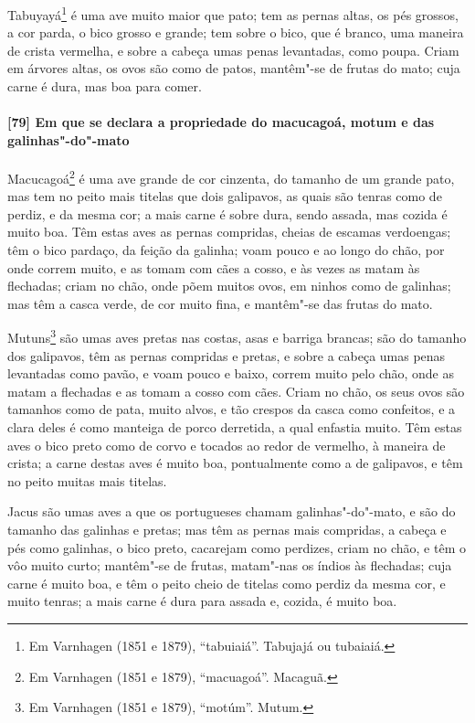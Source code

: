 Tabuyayá\footnote{ Em Varnhagen (1851 e 1879), ``tabuiaiá''. Tabujajá ou tubaiaiá.} é uma
ave muito maior que pato; tem as pernas altas, os pés grossos, a cor parda, o bico grosso
e grande; tem sobre o bico, que é branco, uma maneira de crista vermelha, e sobre a cabeça
umas penas levantadas, como poupa. Criam em árvores altas, os ovos são como de patos,
mantêm"-se de frutas do mato; cuja carne é dura, mas boa para comer.

\paragraph{[79] Em que se declara a propriedade do macucagoá, motum e das galinhas"-do"-mato}\quad
Macucagoá\footnote{ Em Varnhagen (1851 e 1879), ``macuagoá''. Macaguã.} é uma ave grande
de cor cinzenta, do tamanho de um grande pato, mas tem no peito mais titelas que dois
galipavos, as quais são tenras como de perdiz, e da mesma cor; a mais carne é sobre dura,
sendo assada, mas cozida é muito boa. Têm estas aves as
pernas compridas, cheias de escamas verdoengas; têm o bico pardaço, da feição da galinha;
voam pouco e ao longo do chão, por onde correm muito, e as tomam com cães a cosso, e às
vezes as matam às flechadas; criam no chão, onde põem muitos ovos, em ninhos como de
galinhas; mas têm a casca verde, de cor muito fina, e mantêm"-se das frutas do mato.

Mutuns\footnote{ Em Varnhagen (1851 e 1879), ``motúm''. Mutum.} são umas aves pretas nas
costas, asas e barriga brancas; são do tamanho dos galipavos, têm as pernas compridas e
pretas, e sobre a cabeça umas penas levantadas como pavão, e voam pouco e baixo, correm
muito pelo chão, onde as matam a flechadas e as tomam a cosso com cães. Criam no chão, os
seus ovos são tamanhos como de pata, muito alvos, e tão crespos da casca como confeitos, e
a clara deles é como manteiga de porco derretida, a qual enfastia muito. Têm estas aves o
bico preto como de corvo e tocados ao redor de vermelho, à maneira de crista; a carne
destas aves é muito boa, pontualmente como a de galipavos, e têm no peito muitas mais
titelas.

Jacus são umas aves a que os portugueses chamam galinhas"-do"-mato, e são do tamanho das
galinhas e pretas; mas têm as pernas mais compridas, a cabeça e pés como galinhas, o bico
preto, cacarejam como perdizes, criam no chão, e têm o vôo muito curto; mantêm"-se de
frutas, matam"-nas os índios às flechadas; cuja carne é muito boa, e têm o peito cheio de
titelas como perdiz da mesma cor, e muito tenras; a mais carne é dura para assada e,
cozida, é muito boa.

